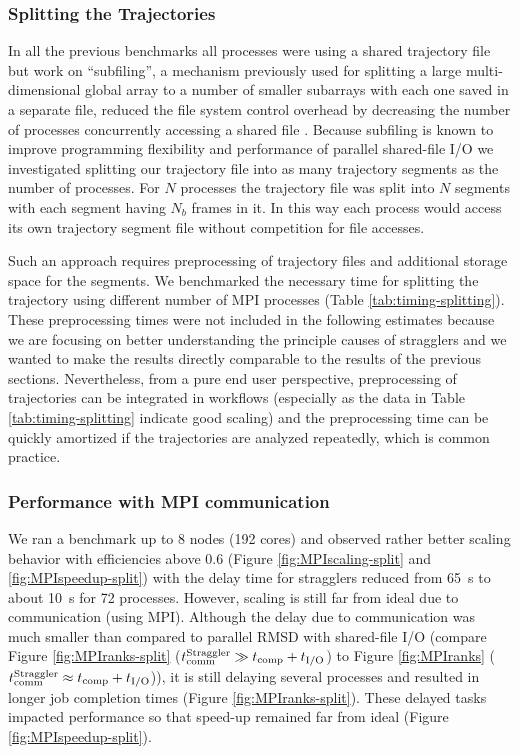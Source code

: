 \subsubsection{Splitting the Trajectories}
\label{splitting-traj}
In all the previous benchmarks all processes were using a shared trajectory file but work on ``subfiling'', a mechanism previously used for splitting a large multi-dimensional global array to a number of smaller subarrays with each one saved in a separate file, reduced the file system control overhead by decreasing the number of processes concurrently accessing a shared file \cite{scalable-IO, scalable-IO1}.
Because subfiling is known to improve programming flexibility and performance of parallel shared-file I/O we investigated splitting our trajectory file into as many trajectory segments as the number of processes.
For $N$ processes the trajectory file was split into $N$ segments with each segment having $N_{b}$ frames in it. 
In this way each  process would access its own trajectory segment file without competition for file accesses. 

Such an approach requires preprocessing of trajectory files and additional storage space for the segments.
We benchmarked the necessary time for splitting the trajectory using different number of MPI processes (Table \ref{tab:timing-splitting}).
These preprocessing times were not included in the following estimates because we are focusing on better understanding the principle causes of stragglers and we wanted to make the results directly comparable to the results of the previous sections.
Nevertheless, from a pure end user perspective, preprocessing of trajectories can be integrated in workflows (especially as the data in Table \ref{tab:timing-splitting} indicate good scaling) and the preprocessing time can be quickly amortized if the trajectories are analyzed repeatedly, which is common practice.


\subsubsection*{Performance with MPI communication}
We ran a benchmark up to 8 nodes (192 cores) and observed rather better scaling behavior with efficiencies above 0.6 (Figure \ref{fig:MPIscaling-split} and \ref{fig:MPIspeedup-split}) with the delay time for stragglers reduced from 65~s to about 10~s for 72 processes. 
However, scaling is still far from ideal due to communication (using MPI). 
Although the delay due to communication was much smaller than compared to parallel RMSD with shared-file I/O (compare Figure \ref{fig:MPIranks-split} ($t_{\text{comm}}^{\text{Straggler}} \gg {t}_{\text{comp}}+{t}_{\text{I/O}}$) to Figure \ref{fig:MPIranks} ($t_{\text{comm}}^{\text{Straggler}} \approx {t}_{\text{comp}}+{t}_{\text{I/O}}$)), it is still delaying several processes and resulted in longer job completion times (Figure \ref{fig:MPIranks-split}). 
These delayed tasks impacted performance so that speed-up remained far from ideal (Figure \ref{fig:MPIspeedup-split}).

